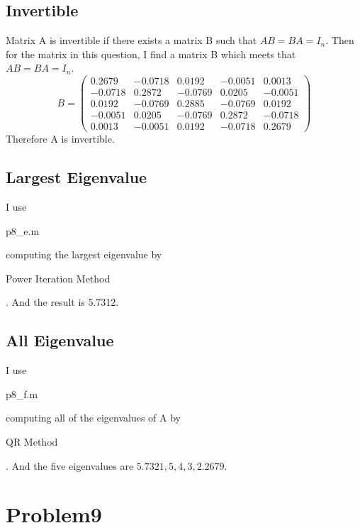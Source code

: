 \documentclass[11pt]{article}
\begin{document}
	\subsection{Invertible}
	Matrix A is invertible if there exists a matrix B such that \(AB = BA = I_n\). Then for the matrix in this question, I find a matrix B which meets that \(AB = BA = I_n\).
	\begin{equation}B = \left(\begin{array}{ccccc} 
		0.2679 & -0.0718 & 0.0192 & -0.0051 & 0.0013\\
		-0.0718 & 0.2872 & -0.0769 & 0.0205 & {-0.0051}\\
		0.0192 & {-0.0769} & 0.2885 & {-0.0769} & 0.0192\\
		{-0.0051} & 0.0205 & {-0.0769} & 0.2872 & {-0.0718}\\
		0.0013 & {-0.0051} & 0.0192 & {-0.0718} & 0.2679
		\end{array}\right)\end{equation}
		Therefore A is invertible.
	\subsection{Largest Eigenvalue}
	I use \begin{itshape}p8\_e.m\end{itshape} computing the largest eigenvalue by \begin{itshape}Power Iteration Method\end{itshape}. And the result is 5.7312.
	\subsection{All Eigenvalue}
	I use \begin{itshape}p8\_f.m\end{itshape} computing all of the eigenvalues of A by \begin{itshape}QR Method\end{itshape}. And the five eigenvalues are \(5.7321, 5, 4, 3, 2.2679\).
	\section{Problem9}
\end{document}
